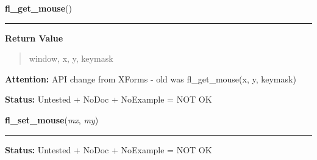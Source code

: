     \vspace{0.5ex}

\hspace{.8\funcindent}\begin{boxedminipage}{\funcwidth}

    \raggedright \textbf{fl\_get\_mouse}()

    \vspace{-1.5ex}

    \rule{\textwidth}{0.5\fboxrule}
\setlength{\parskip}{2ex}
\setlength{\parskip}{1ex}
      \textbf{Return Value}
    \vspace{-1ex}

      \begin{quote}
      window, x, y, keymask

      \end{quote}

\textbf{Attention:} API change from XForms - old was fl\_get\_mouse(x, y, keymask)



\textbf{Status:} Untested + NoDoc + NoExample = NOT OK



    \end{boxedminipage}

    \label{xformslib:library:fl_set_mouse}

    \vspace{0.5ex}

\hspace{.8\funcindent}\begin{boxedminipage}{\funcwidth}

    \raggedright \textbf{fl\_set\_mouse}(\textit{mx}, \textit{my})

    \vspace{-1.5ex}

    \rule{\textwidth}{0.5\fboxrule}
\setlength{\parskip}{2ex}
\setlength{\parskip}{1ex}
\textbf{Status:} Untested + NoDoc + NoExample = NOT OK



    \end{boxedminipage}

    \label{xformslib:library:fl_get_win_mouse}

    \vspace{0.5ex}

